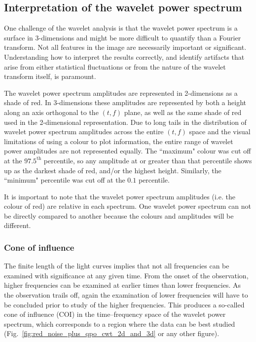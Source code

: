 \documentclass[fleqn,usenatbib]{mnras}
\begin{document}
\subsection{Interpretation of the wavelet power spectrum}

One challenge of the wavelet analysis is that the wavelet power spectrum is a surface in 3-dimensions and might be more difficult to quantify than a Fourier transform.  Not all features in the image are necessarily important or significant.  Understanding how to interpret the results correctly, and identify artifacts that arise from either statistical fluctuations or from the nature of the wavelet transform itself, is paramount.

The wavelet power spectrum amplitudes are represented in  2-dimensions as a shade of red. In 3-dimensions these amplitudes are represented by both a height along an axis orthogonal to the $(t,f)$ plane, as well as the same shade of red used in the 2-dimensional representation. Due to long tails in the distribution of wavelet power spectrum amplitudes across the entire $(t,f)$ space and the visual limitations of using a colour to plot information, the entire range of wavelet power amplitudes are not represented equally. The ``maximum" colour was cut off at the $97.5^{\text{th}}$ percentile, so any amplitude at or greater than that percentile shows up as the darkest shade of red, and/or the highest height. Similarly, the ``minimum" percentile was cut off at the $0.1$ percentile.

It is important to note that the wavelet power spectrum amplitudes (i.e. the colour of red) are relative in each spectrum.  One wavelet power spectrum can not be directly compared to another because the colours and amplitudes will be different.  

\subsubsection{Cone of influence}

The finite length of the light curves implies that not all frequencies can be examined with significance at any given time.  From the onset of the observation, higher frequencies can be examined at earlier times than lower frequencies.  As the observation trails off, again the examination of lower frequencies will have to be concluded prior to study of the higher frequencies.  This produces a so-called cone of influence (COI) in the time--frequency space of the wavelet power spectrum, which corresponds to a region where the data can be best studied (Fig.~\ref{fig:red_noise_plus_qpo_cwt_2d_and_3d} or any other figure).
\end{document}
